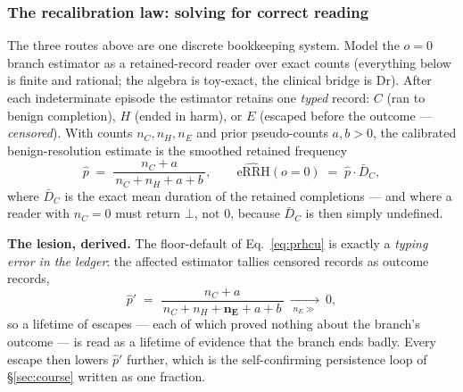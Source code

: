 \documentclass[9pt,twocolumn]{article}
\newcommand{\eRRHhat}{\widehat{\mathrm{eRRH}}}
\begin{document}
\subsubsection{The recalibration law: solving for correct reading}
\label{sec:recal}
The three routes above are one discrete bookkeeping system. Model the $o{=}0$ branch estimator as a retained-record reader over exact counts (everything below is finite and rational; the algebra is toy-exact, the clinical bridge is Dr). After each indeterminate episode the estimator retains one \emph{typed} record: $C$ (ran to benign completion), $H$ (ended in harm), or $E$ (escaped before the outcome --- \emph{censored}). With counts $n_C,n_H,n_E$ and prior pseudo-counts $a,b>0$, the calibrated benign-resolution estimate is the smoothed retained frequency
\begin{equation}
\hat p \;=\; \frac{n_C+a}{\,n_C+n_H+a+b\,},
\qquad
\eRRHhat(o{=}0)\;=\;\hat p\cdot\bar D_C,
\label{eq:ledger}
\end{equation}
where $\bar D_C$ is the exact mean duration of the retained completions --- and where a reader with $n_C=0$ must return $\bot$, not $0$, because $\bar D_C$ is then simply undefined.

\textbf{The lesion, derived.} The floor-default of Eq.~\ref{eq:prhcu} is exactly a \emph{typing error in the ledger}: the affected estimator tallies censored records as outcome records,
\begin{equation}
\hat p'\;=\;\frac{n_C+a}{\,n_C+n_H+\mathbf{n_E}+a+b\,}\ \xrightarrow[\;n_E\gg\;]{}\ 0,
\label{eq:lesion}
\end{equation}
so a lifetime of escapes --- each of which proved nothing about the branch's outcome --- is read as a lifetime of evidence that the branch ends badly. Every escape then lowers $\hat p'$ further, which is the self-confirming persistence loop of \S\ref{sec:course} written as one fraction.
\end{document}
